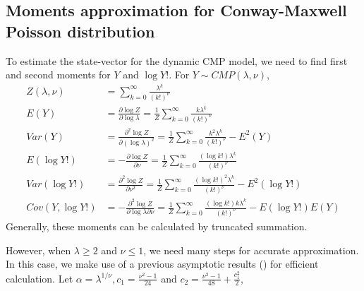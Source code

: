 \documentclass[aoas]{imsart}
\theoremstyle{plain}
\theoremstyle{remark}
\begin{document}
\begin{appendix}
\section{Moments approximation for Conway-Maxwell Poisson distribution}\label{appB}
To estimate the state-vector for the dynamic CMP model, we need to find first and second moments for $Y$ and $\log Y!$. For $Y\sim CMP(\lambda, \nu)$,
\begin{align}
	Z(\lambda, \nu) &= \sum_{k=0}^{\infty}\frac{\lambda^k}{(k!)^\nu}\\
	E(Y) &= \frac{\partial\log Z}{\partial \log\lambda} = \frac{1}{Z}\sum_{k=0}^{\infty}\frac{k\lambda^k}{(k!)^\nu} \nonumber\\
	Var(Y) &= \frac{\partial^2\log Z}{\partial(\log \lambda)^2} = \frac{1}{Z}\sum_{k=0}^{\infty}\frac{k^2\lambda^k}{(k!)^\nu} - E^2(Y) \nonumber\\
	E(\log Y!) &= -\frac{\partial\log Z}{\partial\nu} = \frac{1}{Z}\sum_{k=0}^{\infty}\frac{(\log k!)\lambda^k}{(k!)^\nu} \nonumber\\
	Var(\log Y!) &= \frac{\partial^2\log Z}{\partial \nu^2} = \frac{1}{Z}\sum_{k=0}^{\infty}\frac{(\log k!)^2\lambda^k}{(k!)^\nu} - E^2(\log Y!) \nonumber\\
	Cov(Y, \log Y!) &= -\frac{\partial^2\log Z}{\partial \log\lambda\partial\nu} = \frac{1}{Z}\sum_{k=0}^{\infty}\frac{(\log k!) k\lambda^k}{(k!)^\nu} - E(\log Y!)E(Y) \nonumber
\end{align}
Generally, these moments can be calculated by truncated summation.

However, when $\lambda \geq 2$ and $\nu \leq 1$, we need many steps for accurate approximation. In this case, we make use of a previous asymptotic results (\cite{Chatla2018,Gaunt2019}) for efficient calculation. Let $\alpha = \lambda^{1/\nu}, c_1 = \frac{\nu^2-1}{24}$ and $c_2 = \frac{\nu^2 - 1}{48} + \frac{c_1^2}{2}$,


\end{appendix}
\end{document}
